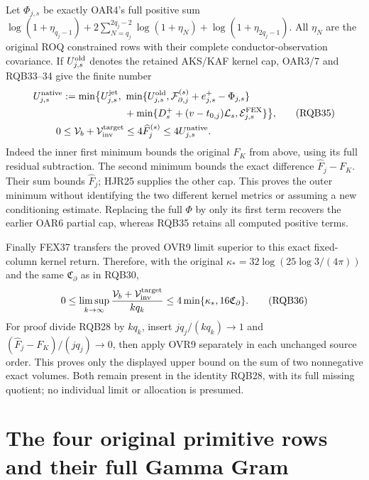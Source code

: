 \documentclass[10pt]{article}
\begin{document}
Let $\Phi_{j,s}$ be exactly OAR4's full positive sum
$\log(1+\eta_{q_j-1})+
2\sum_{N=q_j}^{2q_j-2}\log(1+\eta_N)+\log(1+\eta_{2q_j-1})$.
All $\eta_N$ are the original ROQ constrained rows with their complete
conductor-observation covariance. If $U_{j,s}^{\rm old}$ denotes the
retained AKS/KAF kernel cap, OAR3/7 and RQB33--34 give the finite number
\[
\begin{split}
 U_{j,s}^{\rm native}
   :=\min\bigl\{U_{j,s}^{\rm jet},\
       &\min\{U_{j,s}^{\rm old},
              \mathcal F_{\partial,j}^{(s)}+e_{j,s}^+-\Phi_{j,s}\}\\
       &+\min\{D_s^++(v-t_{0,j})\mathcal L_s,
                                     \mathcal E_{j,s}^{\rm FEX}\}\bigr\},\\
 0\le\mathcal V_b+\mathcal V_{\rm inv}^{\rm target}
             &\le4\widehat F_j^{(s)}
                       \le4U_{j,s}^{\rm native}.
\end{split}\tag{RQB35}
\]
Indeed the inner first minimum bounds the original $F_K$ from above,
using its full residual subtraction. The second minimum bounds the
exact difference $\widehat F_j-F_K$. Their sum bounds $\widehat F_j$;
HJR25 supplies the other cap. This proves the outer minimum without
identifying the two different kernel metrics or assuming a new
conditioning estimate. Replacing the full $\Phi$ by only its first
term recovers the earlier OAR6 partial cap, whereas RQB35 retains
all computed positive terms.

Finally FEX37 transfers the proved OVR9 limit superior to this exact
fixed-column kernel return. Therefore, with the original
$\kappa_*=32\log(25\log3/(4\pi))$ and the same
$\mathfrak C_\partial$ as in RQB30,
\[
 0\le\limsup_{k\to\infty}
       \frac{\mathcal V_b+\mathcal V_{\rm inv}^{\rm target}}{kq_k}
       \le4\min\{\kappa_*,16\mathfrak C_\partial\}.
 \tag{RQB36}
\]
For proof divide RQB28 by $kq_k$, insert
$j q_j/(kq_k)\to1$ and
$(\widehat F_j-F_K)/(j q_j)\to0$, then apply OVR9 separately
in each unchanged source order. This proves only the displayed
upper bound on the sum of two nonnegative exact volumes.
Both remain present in the identity RQB28, with its full
missing quotient; no individual limit or allocation is presumed.



\section{The four original primitive rows and their full Gamma Gram}
\label{sec:PFG}
\end{document}
